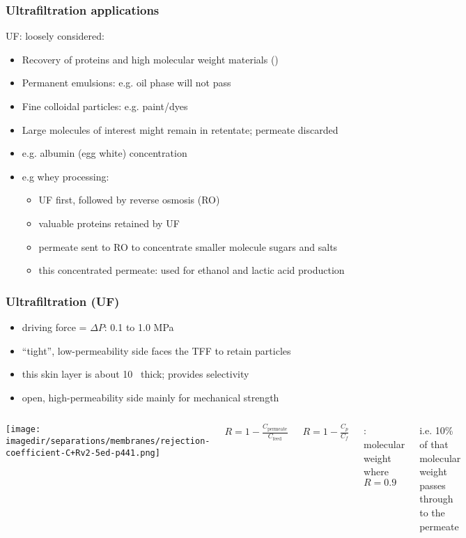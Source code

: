 \begin{frame}\frametitle{Ultrafiltration applications} 
	UF: loosely considered: {\color{myGreen}{``cross-flow filtration at molecular level''}}
	\begin{itemize}
		\item	Recovery of proteins and high molecular weight materials ({\color{purple}{solute}})
		\item	Permanent emulsions: e.g. oil phase will not pass
		\item	Fine colloidal particles: e.g. paint/dyes 
		\item	Large molecules of interest might remain in retentate; permeate discarded
		\item	e.g. albumin (egg white) concentration
		\item	e.g whey processing:
		\begin{itemize}
			\item	UF first, followed by reverse osmosis (RO)
			\item	valuable proteins retained by UF
			\item	permeate sent to RO to concentrate smaller molecule sugars and salts
			\item	this concentrated permeate: used for ethanol and lactic acid production
		\end{itemize}
	\end{itemize}
\end{frame}

\begin{frame}\frametitle{Ultrafiltration (UF)}
	
	\begin{itemize}		
		\item	driving force = $\Delta P$:  0.1 to 1.0 MPa %
		\item	``tight'', low-permeability side faces the TFF to retain particles
		\item	this skin layer is about 10\micron~ thick; provides selectivity 
		\item	open, high-permeability side mainly for mechanical strength %
	\end{itemize}
	
	
	\begin{columns}[t]
			\begin{center}
				\texttt{[image: \\imagedir/separations/membranes/rejection-coefficient-C+Rv2-5ed-p441.png]}
			\end{center}
		
			$R = 1 -\displaystyle \frac{C_\text{permeate}}{C_\text{feed}}$
			
			$R = 1- \displaystyle \frac{C_p}{C_f}$
			
			\vspace{12pt}
			{\color{purple}{MWCO}}: molecular weight where $R=0.9$
			
			\vspace{12pt}
			i.e. 10\% of that molecular weight passes through to the permeate
	\end{columns}	
\end{frame}


